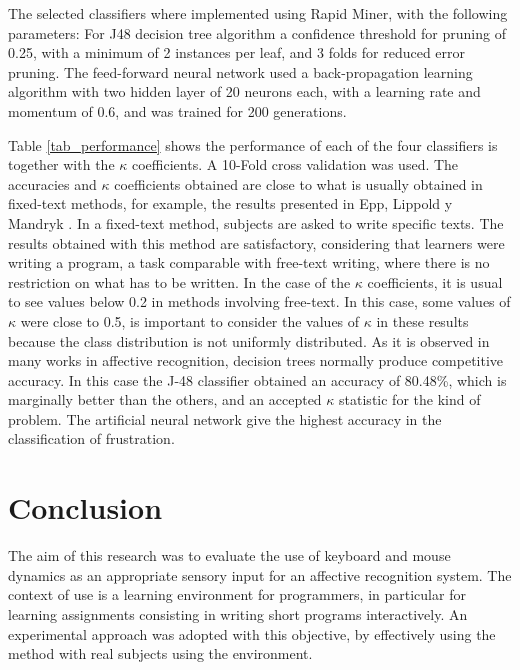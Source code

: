 \documentclass[a4paper,twoside]{article}
\begin{document}
The selected classifiers where implemented using Rapid Miner, with the following parameters:
For J48 decision tree algorithm a confidence threshold for pruning of 0.25, with a
minimum of 2 instances per leaf, and 3 folds for reduced error pruning. The feed-forward 
neural network used a back-propagation learning algorithm with two hidden layer of 20 neurons
each, with a learning rate and momentum of 0.6, and was trained for 200 generations.

Table \ref{tab_performance} shows the performance of each of the four classifiers is together 
with the $\kappa$ coefficients. A 10-Fold cross validation was used. 
The accuracies and $\kappa$ coefficients obtained are close to what is
usually obtained in fixed-text methods, for example, the results presented in
Epp, Lippold y Mandryk \cite{epp2011identifying}. 	
In a fixed-text method, subjects are asked to write specific texts.											 
The results obtained with this method are satisfactory, considering that learners
were writing a program, a task comparable with free-text writing, where there
is no restriction on what has to be written. %
In the case of the $\kappa$ coefficients, it is
usual to see values below 0.2 in methods involving free-text. In this case, some
values of $\kappa$ were close to 0.5, is important to consider the values of $\kappa$
in these results because the class distribution is not uniformly distributed. As
it is observed in many works in affective recognition, decision trees normally
produce competitive accuracy. In this case the J-48 classifier obtained an
accuracy of 80.48\%, which is marginally better than the others, and an accepted $\kappa$
statistic for the kind of problem. The artificial neural network %
give the highest
accuracy in the classification of frustration.

 
\section{Conclusion}

The aim of this research was to evaluate the use of keyboard and mouse dynamics 
as an appropriate sensory input for an affective recognition system. The context
of use is a learning environment for programmers, in particular for learning
assignments consisting in writing short programs interactively. An experimental
approach was adopted with this objective, by effectively using the
method with real subjects using the environment.
\end{document}
